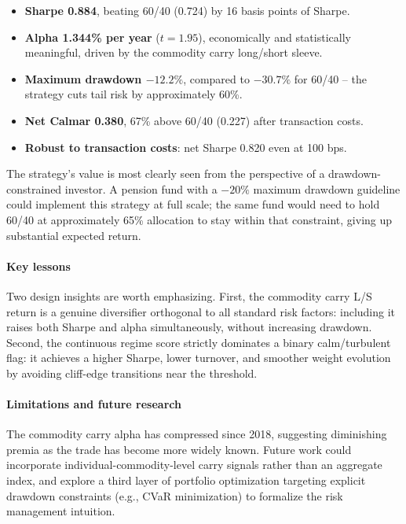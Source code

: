 \documentclass[11pt,letterpaper]{article}
\begin{document}
\begin{itemize}[leftmargin=1.4em,itemsep=2pt,topsep=4pt]
  \item \textbf{Sharpe 0.884}, beating 60/40 (0.724) by 16 basis points of Sharpe.
  \item \textbf{Alpha 1.344\% per year} ($t = 1.95$), economically and
    statistically meaningful, driven by the commodity carry long/short sleeve.
  \item \textbf{Maximum drawdown $-12.2\%$}, compared to $-30.7\%$ for 60/40
    -- the strategy cuts tail risk by approximately 60\%.
  \item \textbf{Net Calmar 0.380}, 67\% above 60/40 (0.227) after transaction costs.
  \item \textbf{Robust to transaction costs}: net Sharpe 0.820 even at 100 bps.
\end{itemize}

The strategy's value is most clearly seen from the perspective of a
drawdown-constrained investor. A pension fund with a $-20\%$ maximum drawdown
guideline could implement this strategy at full scale; the same fund would need to
hold 60/40 at approximately 65\% allocation to stay within that constraint, giving
up substantial expected return.

\paragraph{Key lessons}
Two design insights are worth emphasizing. First, the commodity carry L/S return
is a genuine diversifier orthogonal to all standard risk factors: including it
raises both Sharpe and alpha simultaneously, without increasing drawdown. Second,
the continuous regime score strictly dominates a binary calm/turbulent flag:
it achieves a higher Sharpe, lower turnover, and smoother weight evolution by
avoiding cliff-edge transitions near the threshold.

\paragraph{Limitations and future research}
The commodity carry alpha has compressed since 2018, suggesting diminishing premia
as the trade has become more widely known. Future work could incorporate
individual-commodity-level carry signals rather than an aggregate index,
and explore a third layer of portfolio optimization targeting explicit drawdown
constraints (e.g., CVaR minimization) to formalize the risk management intuition.
\end{document}
